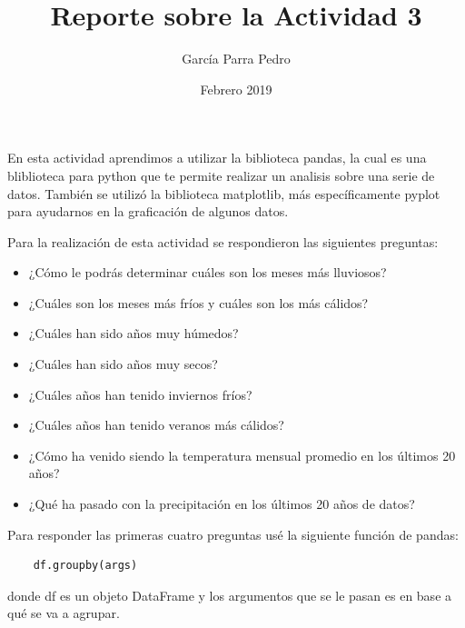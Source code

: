 \documentclass[12pt]{article}
\title{Reporte sobre la Actividad 3}
\author{García Parra Pedro}
\date{Febrero 2019}
\begin{document}
\maketitle

En esta actividad aprendimos a utilizar la biblioteca pandas, la cual es una bliblioteca para python que te permite realizar un analisis sobre una serie de datos. También se utilizó la biblioteca matplotlib, más específicamente pyplot para ayudarnos en la graficación de algunos datos.

Para la realización de esta actividad se respondieron las siguientes preguntas:
\begin{itemize}
    \item ¿Cómo le podrás determinar cuáles son los meses más lluviosos?
    \item ¿Cuáles son los meses más fríos y cuáles son los más cálidos?
    \item ¿Cuáles han sido años muy húmedos? 
    \item ¿Cuáles han sido años muy secos?
    \item ¿Cuáles años han tenido inviernos fríos?
    \item ¿Cuáles años han tenido veranos más cálidos?
    \item ¿Cómo ha venido siendo la temperatura mensual promedio en los últimos 20 años? 
    \item ¿Qué ha pasado con la precipitación en los últimos 20 años de datos? 
\end{itemize}

Para responder las primeras cuatro preguntas usé la siguiente función de pandas:
\begin{verbatim}
    df.groupby(args)
\end{verbatim}
donde df es un objeto DataFrame y los argumentos que se le pasan es en base a qué se va a agrupar.
\end{document}
